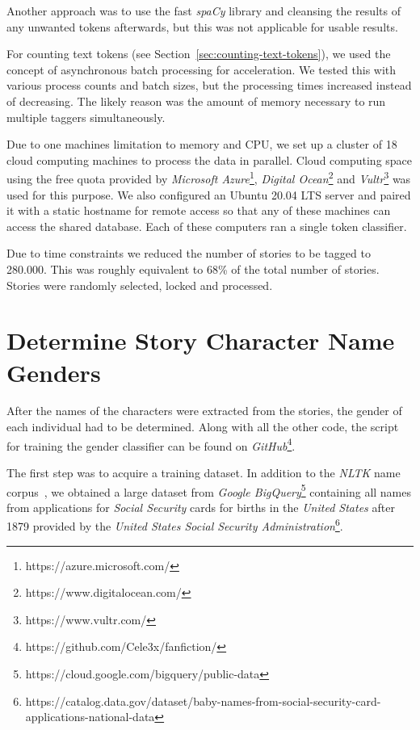 Another approach was to use the fast \emph{spaCy} library and cleansing the results of any unwanted tokens afterwards, but this was not applicable for usable results.

For counting text tokens (see Section~\ref{sec:counting-text-tokens}), we used the concept of asynchronous batch processing for acceleration.
We tested this with various process counts and batch sizes, but the processing times increased instead of decreasing.
The likely reason was the amount of memory necessary to run multiple taggers simultaneously.

Due to one machines limitation to memory and CPU, we set up a cluster of 18 cloud computing machines to process the data in parallel.
Cloud computing space using the free quota provided by \emph{Microsoft Azure}\footnote{https://azure.microsoft.com/}, \emph{Digital Ocean}\footnote{https://www.digitalocean.com/} and \emph{Vultr}\footnote{https://www.vultr.com/} was used for this purpose.
We also configured an Ubuntu 20.04 LTS server and paired it with a static hostname for remote access so that any of these machines can access the shared database.
Each of these computers ran a single token classifier.

Due to time constraints we reduced the number of stories to be tagged to 280.000.
This was roughly equivalent to 68\% of the total number of stories.
Stories were randomly selected, locked and processed.



\section{Determine Story Character Name Genders}\label{sec:determine-character-name-genders}

After the names of the characters were extracted from the stories, the gender of each individual had to be determined.
Along with all the other code, the script for training the gender classifier can be found on \emph{GitHub}\footnote{https://github.com/Cele3x/fanfiction/}.


The first step was to acquire a training dataset.
In addition to the \emph{NLTK} name corpus~\citep{StevenBird2009NaturalPython}, we obtained a large dataset from \emph{Google BigQuery}\footnote{https://cloud.google.com/bigquery/public-data} containing all names from applications for \emph{Social Security} cards for births in the \emph{United States} after 1879 provided by the \emph{United States Social Security Administration}\footnote{https://catalog.data.gov/dataset/baby-names-from-social-security-card-applications-national-data}.

